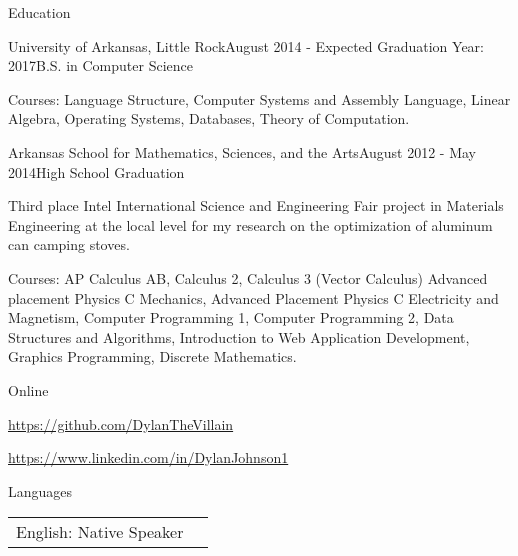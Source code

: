 \documentclass{resume} %
\newcommand{\btab}[2]{
	\bgroup
	\def\arraystretch{#1}
	\begin{tabular}{#2}
}
\newcommand{\etab}{
	\end{tabular} \smallskip
	\egroup
}
\begin{document}
\begin{rSection}{Education}

\begin{rSubsection}{University of Arkansas, Little Rock}{August 2014 - Expected Graduation Year: 2017}{B.S. in Computer Science}

	\item Courses: Language Structure, Computer Systems and Assembly Language, Linear Algebra, Operating Systems, Databases, Theory of Computation.
\end{rSubsection}

\begin{rSubsection}{Arkansas School for Mathematics, Sciences, and the Arts}{August 2012 - May 2014}{High School Graduation}

	\item Third place Intel International Science and Engineering Fair project in Materials Engineering at the local level for my research on the optimization of aluminum can camping stoves.
	\item Courses: AP Calculus AB, Calculus 2, Calculus 3 (Vector Calculus) Advanced placement Physics C Mechanics, Advanced Placement Physics C Electricity and Magnetism, Computer Programming 1, Computer Programming 2, Data Structures and Algorithms, Introduction to Web Application Development, Graphics Programming, Discrete Mathematics.
\end{rSubsection}

\end{rSection}

\begin{rSection}{Online}

	\item {\href{https://github.com/DylanTheVillain}{https://github.com/DylanTheVillain}}
	\item {\href{https://www.linkedin.com/in/DylanJohnson1}{https://www.linkedin.com/in/DylanJohnson1}}
\end{rSection}

\begin{rSection}{Languages}

\btab{1.1}{ l l }
	English: Native Speaker
\etab

\end{rSection}

\clearpage
\end{document}
